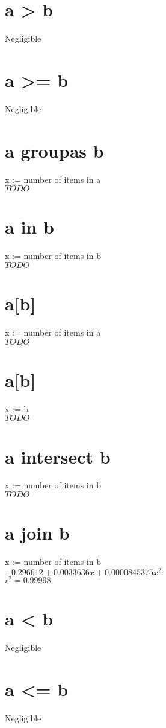 \documentclass[12pt]{article}
\begin{document}
	\section{a > b}
	Negligible
	
	\section{a >= b}
	Negligible
	
	\section{a groupas b}
	x := number of items in a\\
	$TODO$
	
	\section{a in b}
	x := number of items in b\\
	$TODO$
	
	\section{a[b]}
	x := number of items in a\\
	$TODO$
	
	\section{a[b]}
	x := b\\
	$TODO$
	
	\section{a intersect b}
	x := number of items in b\\
	$TODO$
	
	\section{a join b}
	x := number of items in b\\
	$-0.296612 + 0.0033636x + 0.0000845375x^2$\\
	$r^2 = 0.99998$
	
	\section{a < b}
	Negligible
	
	\section{a <= b}
	Negligible
	
\end{document}
